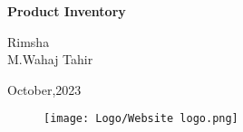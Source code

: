 \begin{Titlepage}
\begin{center}
    \vspace*{2cm}
    
    \textbf{\Huge Product Inventory }\\
    \vspace*{2cm}
    
      
      \vspace{0.2cm}
      \begin{center}
          \large Rimsha\\ M.Wahaj Tahir\\
      \end{center} 
    
    \vspace{1.5cm}
    \begin{center}
    \large October,2023 
    \end{center}
    
    \vfill
    \vspace{0.8cm}
    \begin{figure}[hb]
        \centering
        \texttt{[image: Logo/Website logo.png]}
    \end{figure}
    \end{center}
\end{Titlepage}








